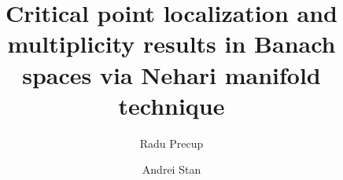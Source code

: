 \documentclass{birkjour}
\theoremstyle{definition}
\theoremstyle{remark}
\numberwithin{equation}{section}
\begin{document}
%
%
%
%
%
%
%
%
%


\title[Critical point localization and multiplicity results]{Critical point
localization and multiplicity results in Banach spaces via Nehari manifold
technique}



\author[R. Precup]{Radu Precup}
\address{%
Faculty of Mathematics and Computer Science and Institute of Advanced Studies in Science and Technology\\
Babe\c{s}-Bolyai University, 400084 Cluj-Napoca, Romania\\
\& Tiberiu Popoviciu Institute of Numerical Analysis, Romanian Academy\\
P.O. Box 68-1, 400110 Cluj-Napoca, Romania}
%
\author[A. Stan]{Andrei Stan}
\address{%
Faculty of Mathematics and Computer Science, Babe\c{s}-Bolyai University, \\400084 Cluj-Napoca, Romania\\
\& Tiberiu Popoviciu Institute of Numerical Analysis, Romanian Academy\\
P.O. Box 68-1, 400110 Cluj-Napoca, Romania}

\end{document}
